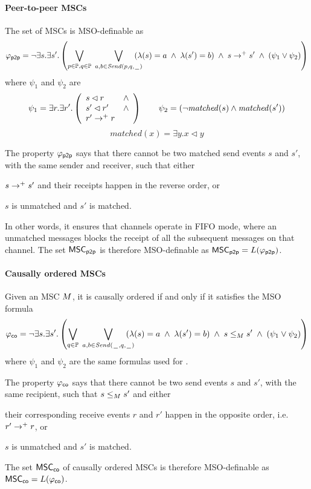 \paragraph*{Peer-to-peer MSCs}
	The set of \pp MSCs is MSO-definable as
	\[
		\varphi_{\mathsf{p2p}} = \neg \exists s.\exists s'. \left(
		\bigvee_{\substack{p \in \mathbb{P}, q \in \mathbb{P}}}\;
		\bigvee_{\substack{a,b \in {\mathit{Send}(p,q,\hspace{0.1em}\underline{\hspace{0.5em}}\hspace{0.1em})}}}\hspace{-1em}
		(\lambda(s) = a \;\wedge\; \lambda(s') = b) \;\wedge\; s \to^+ s' \;\wedge\;
		(\psi_1 \vee \psi_2 ) 	
		\right)
	\]
	where $\psi_1$ and $\psi_2$ are
	\[
		\psi_1 = \exists r.\exists r'.\left(
		\begin{array}{ll}
			s \lhd r & \wedge\\
			s' \lhd r' & \wedge\\
			r' \to^+ r &
		\end{array} 
		\right) \quad \quad
		\psi_2 = (\neg \mathit{matched}(s) \wedge \mathit{matched}(s'))
		\]
		\[
		matched(x) = \exists y. x \lhd y
	\]

The property $\varphi_{\mathsf{p2p}}$ says that there cannot be two matched send events $s$ and $s'$, with the same sender and receiver, such that either
\begin{enumerate*}[label={(\roman*)}]
	\item $s \to^+ s'$ and their receipts happen in the reverse order, or
	\item $s$ is unmatched and $s'$ is matched.
\end{enumerate*}
In other words, it ensures that channels operate in FIFO mode, where an unmatched messages blocks the receipt of all the subsequent messages on that channel.
The set $\mathsf{MSC}_{\mathsf{p2p}}$ is therefore MSO-definable as $\mathsf{MSC}_{\mathsf{p2p}}=L(\varphi_{\mathsf{p2p}})$.

\paragraph*{Causally ordered MSCs}
Given an MSC $M$, it is causally ordered if and only if it satisfies the MSO formula
\[
	\varphi_{\mathsf{co}} = \neg \exists s.\exists s'. \left(
	\bigvee_{\substack{q \in \mathbb{P}}}\;
	\bigvee_{\substack{a,b \in {\mathit{Send}(\hspace{0.1em}\underline{\hspace{0.5em}}\hspace{0.1em},q,\hspace{0.1em}\underline{\hspace{0.5em}}\hspace{0.1em})}}}\hspace{-1em}
	(\lambda(s) = a \;\wedge\; \lambda(s') = b) \;\wedge\; s \le_M s' \;\wedge\;
	(\psi_1 \vee \psi_2 ) 	
	\right)
\]
where $\psi_1$ and $\psi_2$ are the same formulas used for \pp.

The property $\varphi_{\mathsf{co}}$ says that there cannot be two send events $s$ and $s'$, with the same recipient, such that $s \le_M s'$ and either
\begin{enumerate*}[label={(\roman*)}]
	\item their corresponding receive events $r$ and $r'$ happen in the opposite order, i.e. $r' \to^+ r$, or
	\item $s$ is unmatched and $s'$ is matched.
\end{enumerate*}
The set $\mathsf{MSC}_{\mathsf{co}}$ of causally ordered MSCs is therefore MSO-definable as $\mathsf{MSC}_{\mathsf{co}}=L(\varphi_{\mathsf{co}})$.


